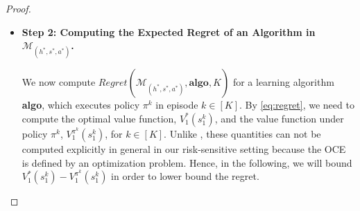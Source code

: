 \documentclass[11pt]{article}
\newcommand{\1}{\mathbbm{1}}
\begin{document}
\begin{proof}
\begin{itemize}
The reward function is defined as 
\begin{equation*}
r_h(s,a):=1\{s=\tilde{s}_g,h\geq \bar{H}+d+1\},\ \forall a\in \mathcal{A} .
\end{equation*}
For each 
\begin{equation*}
(h^*,s^*,a^*)\in\{1+d,\cdots,\bar{H}+d\}\times\mathcal{L}\times\mathcal{A} =: \mathcal{Z},
\end{equation*}
we define an MDP $\mathcal{M}_{(h^*,s^*,a^*)}$, where $\Delta_{(h^*,s^*,a^*)}(h,\tilde{s}_i,a)=1\{h=h^*,\tilde{s}_i=s^*,a=a^*\}\epsilon$ and $\epsilon$ is a parameter to be chosen later. Denote by $P_{(h^*,s^*,a^*)}$ and $E_{(h^*,s^*,a^*)}$ the probability measure and expectation, respectively, in the MDP $\mathcal{M}_{(h^*,s^*,a^*)}$.
Let $\mathcal{M}_0$ be the MDP with $\Delta_0(h,\tilde{s}_i,a)=0$ for all $(h,\tilde{s}_i,a)\in [H]\times\mathcal{L}\times\mathcal{A}$. Denote by $P_0$ and $E_0$ the probability measure and expectation, respectively, in the MDP $\mathcal{M}_0$. 

\item  \textbf{Step 2: Computing the Expected Regret of an Algorithm in $\mathcal{M}_{(h^*,s^*,a^*)}$.}

We now compute
$Regret(\mathcal{M}_{(h^*,s^*,a^*)},\textbf{algo},K)$ for a learning algorithm \textbf{algo}, which executes policy $\pi^k$ in episode $k \in [K]$. By \eqref{eq:regret}, we need to compute the optimal value function, $V^*_1(s_1^k)$, and the value function under policy $\pi^k$, $V_1^{\pi^k}(s_1^k)$, for $k\in [K]$. 
Unlike \cite{domingues2021episodic}, these quantities can not be computed explicitly in general in our risk-sensitive setting because the OCE is defined by an optimization problem. Hence, in the following, we will bound $V_1^*(s_1^k)-V_1^{\pi^k}(s_1^k)$ in order to lower bound the regret. 




\end{itemize}
\end{proof}
\end{document}
